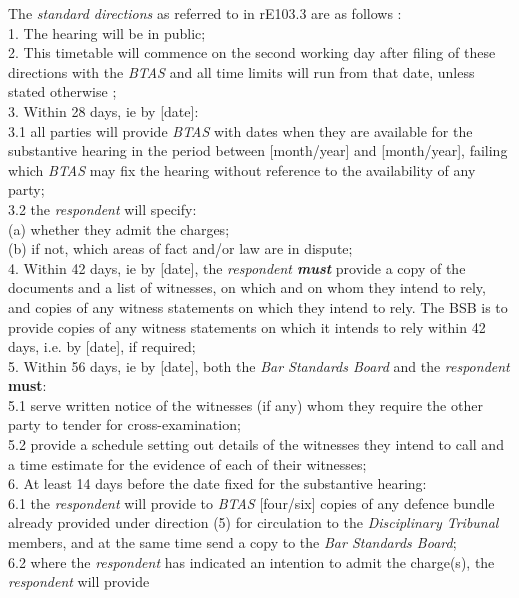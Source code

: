 \par
The \emph{standard directions }as referred to in rE103.3 are as follows
:\\
1. The hearing will be in public;\\
2. This timetable will commence on the second working day after filing
of these directions with the \emph{BTAS} and all time limits will run
from that date, unless stated otherwise ;\\
3. Within 28 days, ie by {[}date{]}:\\
3.1 all parties will provide \emph{BTAS }with dates when they are
available for the substantive hearing in the period between
{[}month/year{]} and {[}month/year{]}, failing which \emph{BTAS }may fix
the hearing without reference to the availability of any party;\\
3.2 the \emph{respondent }will specify:\\
(a) whether they admit the charges;\\
(b) if not, which areas of fact and/or law are in dispute;\\
4. Within 42 days, ie by {[}date{]}, the \emph{respondent  \textcolor{myred}{\textbf{must}} }provide
a copy of the documents and a list of witnesses, on which and on whom
they intend to rely, and copies of any witness statements on which they
intend to rely. The BSB is to provide copies of any witness statements
on which it intends to rely within 42 days, i.e. by {[}date{]}, if
required;\\
5. Within 56 days, ie by {[}date{]}, both the \emph{Bar Standards
Board} and the \emph{respondent}  \textcolor{myred}{\textbf{must}}:\\
5.1 serve written notice of the witnesses (if any) whom they require the
other party to tender for cross-examination;\\
5.2 provide a schedule setting out details of the witnesses they intend
to call and a time estimate for the evidence of each of their
witnesses;\\
6. At least 14 days before the date fixed for the substantive hearing:\\
6.1 the \emph{respondent} will provide to \emph{BTAS} {[}four/six{]}
copies of any defence bundle already provided under direction (5) for
circulation to the \emph{Disciplinary Tribunal} members, and at the same
time send a copy to the \emph{Bar Standards Board};\\
6.2 where the \emph{respondent} has indicated an intention to admit the
charge(s), the \emph{respondent} will provide
